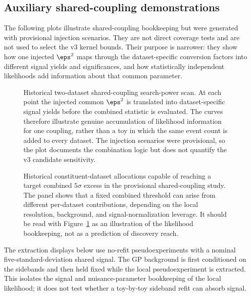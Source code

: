 \FloatBarrier

\subsection{Auxiliary shared-coupling demonstrations}

The following plots illustrate shared-coupling bookkeeping but were generated with
provisional injection scenarios. They are not direct \CLs{} coverage tests and are not
used to select the v3 kernel bounds. Their purpose is narrower: they show how one
injected $\eps^2$ maps through the dataset-specific conversion factors into different
signal yields and significances, and how statistically independent likelihoods add
information about that common parameter.

\begin{figure}[p]
\centering
{}
\caption{Historical two-dataset shared-coupling search-power scan. At each point the
injected common $\eps^2$ is translated into dataset-specific signal yields before the
combined statistic is evaluated. The curves therefore illustrate genuine accumulation
of likelihood information for one coupling, rather than a toy in which the same event
count is added to every dataset. The injection scenarios were provisional, so the
plot documents the combination logic but does not quantify the v3 candidate
sensitivity.}
\label{fig:app-combined-search-power}
\end{figure}

\begin{figure}[p]
\centering
{}
\caption{Historical constituent-dataset allocations capable of reaching a target
combined $5\sigma$ excess in the provisional shared-coupling study. The panel shows
that a fixed combined threshold can arise from different per-dataset contributions,
depending on the local resolution, background, and signal-normalization leverage.
It should be read with Figure~\ref{fig:app-combined-search-power} as an illustration
of the likelihood bookkeeping, not as a prediction of discovery reach.}
\label{fig:app-combined-search-power-constituents}
\end{figure}

The extraction displays below use no-refit pseudoexperiments with a nominal
five-standard-deviation shared signal. The GP background is first conditioned on the
sidebands and then held fixed while the local pseudoexperiment is extracted. This
isolates the signal and nuisance-parameter bookkeeping of the local likelihood; it
does not test whether a toy-by-toy sideband refit can absorb signal.

